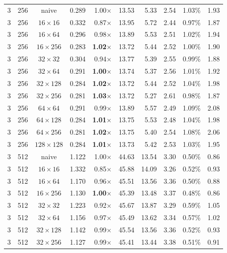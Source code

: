 \documentclass[11pt,a4paper]{article}
\begin{document}
{\begin{longtable}{rrcrrrrrrr}
3 & 256 & naive & 0.289 & 1.00$\times$ & 13.53 & 5.33 & 2.54 & 1.03\% & 1.93 \\
3 & 256 & $16\times 16$ & 0.332 & 0.87$\times$ & 13.95 & 5.72 & 2.44 & 0.97\% & 1.87 \\
3 & 256 & $16\times 64$ & 0.296 & 0.98$\times$ & 13.89 & 5.53 & 2.51 & 1.02\% & 1.94 \\
3 & 256 & $16\times 256$ & 0.283 & \textbf{1.02$\times$} & 13.72 & 5.44 & 2.52 & 1.00\% & 1.90 \\
3 & 256 & $32\times 32$ & 0.304 & 0.94$\times$ & 13.77 & 5.39 & 2.55 & 0.99\% & 1.88 \\
3 & 256 & $32\times 64$ & 0.291 & \textbf{1.00$\times$} & 13.74 & 5.37 & 2.56 & 1.01\% & 1.92 \\
3 & 256 & $32\times 128$ & 0.284 & \textbf{1.02$\times$} & 13.72 & 5.44 & 2.52 & 1.04\% & 1.98 \\
3 & 256 & $32\times 256$ & 0.281 & \textbf{1.03$\times$} & 13.72 & 5.27 & 2.61 & 0.98\% & 1.87 \\
3 & 256 & $64\times 64$ & 0.291 & 0.99$\times$ & 13.89 & 5.57 & 2.49 & 1.09\% & 2.08 \\
3 & 256 & $64\times 128$ & 0.284 & \textbf{1.01$\times$} & 13.75 & 5.53 & 2.48 & 1.04\% & 1.98 \\
3 & 256 & $64\times 256$ & 0.281 & \textbf{1.02$\times$} & 13.75 & 5.40 & 2.54 & 1.08\% & 2.06 \\
3 & 256 & $128\times 128$ & 0.284 & \textbf{1.01$\times$} & 13.73 & 5.42 & 2.53 & 1.03\% & 1.95 \\
\midrule
3 & 512 & naive & 1.122 & 1.00$\times$ & 44.63 & 13.54 & 3.30 & 0.50\% & 0.86 \\
3 & 512 & $16\times 16$ & 1.332 & 0.85$\times$ & 45.88 & 14.09 & 3.26 & 0.52\% & 0.93 \\
3 & 512 & $16\times 64$ & 1.170 & 0.96$\times$ & 45.51 & 13.56 & 3.36 & 0.50\% & 0.88 \\
3 & 512 & $16\times 256$ & 1.130 & \textbf{1.00$\times$} & 45.39 & 13.48 & 3.37 & 0.48\% & 0.86 \\
3 & 512 & $32\times 32$ & 1.223 & 0.92$\times$ & 45.67 & 13.87 & 3.29 & 0.59\% & 1.05 \\
3 & 512 & $32\times 64$ & 1.156 & 0.97$\times$ & 45.49 & 13.62 & 3.34 & 0.57\% & 1.02 \\
3 & 512 & $32\times 128$ & 1.142 & 0.99$\times$ & 45.54 & 13.56 & 3.36 & 0.52\% & 0.93 \\
3 & 512 & $32\times 256$ & 1.127 & 0.99$\times$ & 45.41 & 13.44 & 3.38 & 0.51\% & 0.91 \\

\end{longtable}}
\end{document}
